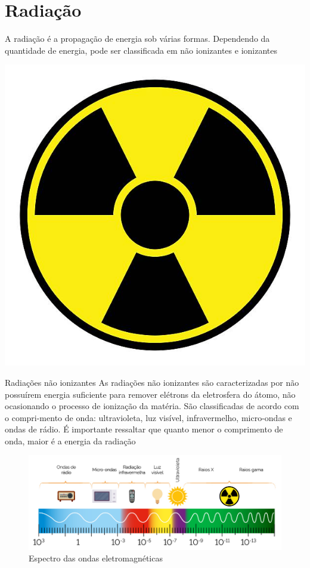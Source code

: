 \documentclass[presentation,professionalfonts,aspectratio=169]{beamer}
\begin{document}
\section{Radiação}
\label{sec:org34d6c0f}
\begin{frame}[label={sec:org02d7a7f}]{}
A  radiação  é  a  propagação  de  energia  sob  várias  formas.  Dependendo  da  quantidade de energia, pode ser classificada em não ionizantes e ionizantes

\begin{center}
\includegraphics[scale=0.5]{FQ/Radioatividade/RadiacaoSymbol.jpg}
\end{center}
\end{frame}

\begin{frame}[label={sec:org55aabb4}]{Radiações não ionizantes}
As radiações não ionizantes são caracterizadas por não possuírem energia suficiente para remover elétrons da eletrosfera do átomo, não ocasionando o processo de ionização da matéria. São classificadas de acordo com o compri-mento de onda: ultravioleta, luz visível, infravermelho, micro-ondas e ondas de rádio.  É  importante  ressaltar  que  quanto  menor  o  comprimento  de  onda, maior é a energia da radiação

\begin{figure}[htbp]
\centering
\includegraphics[scale=0.3]{FQ/Radioatividade/espectro.png}
\caption{\label{fig:org6f19ca6}Espectro das ondas eletromagnéticas}
\end{figure}
\end{frame}
\end{document}
